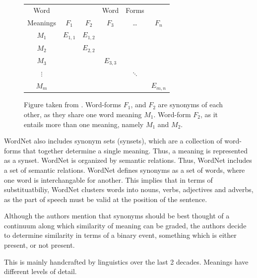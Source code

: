 \documentclass[a4paper,12pt,twoside,openright]{report}
\begin{document}

\begin{figure}[H]
\begin{center}
\begin{tabular}{ | c | c  c  c  c  c | } 
 \hline
 Word        &  &  & Word & Forms &  \\ 
 Meanings & $F_1$ & $F_2$ & $F_3$ & \ldots & $F_n$ \\ 
 \hline
 $M_1$     & $E_{1,1}$ & $E_{1,2}$ &  &  &  \\ 
 $M_2$     &  & $E_{2,2}$ &  &  &  \\ 
 $M_3$     &  &  & $E_{3, 3}$ &  &  \\ 
 $\vdots$ &  &  &  & $\ddots$ &  \\ 
 $M_m$    &  &  &  &  & $E_{m, n}$ \\ 
 \hline
\end{tabular}
\end{center}
\caption{Figure taken from \cite{miller90}. Word-forms $F_1$, and $F_2$ are synonyms of each other, as they share one word meaning $M_1$. Word-form $F_2$, as it entails more than one meaning, namely $M_1$ and $M_2$.}
\end{figure}

WordNet also includes synonym sets (synsets), which are a collection of word-forms that together determine a single meaning.
Thus, a meaning is represented as a synset.
WordNet is organized by semantic relations.
Thus, WordNet includes a set of semantic relations.
WordNet defines synonyms as a set of words, where one word is interchangable for another.
This implies that in terms of substituatbiliy, WordNet clusters words into nouns, verbs, adjectives and adverbs, as the part of speech must be valid at the position of the sentence.

Although the authors mention that synonyms should be best thought of a continuum along which similarity of meaning can be graded, the authors decide to determine similarity in terms of a binary event, something which is either present, or not present.

This is mainly handcrafted by linguistics over the last 2 decades.
Meanings have different levels of detail.
\end{document}

